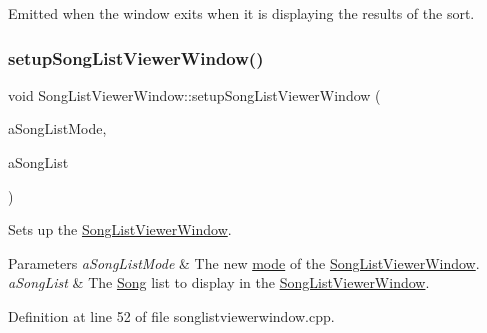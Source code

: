 Emitted when the window exits when it is displaying the results of the sort. 

\mbox{\label{class_song_list_viewer_window_ae26127c85ed57885461c5143be4ae1e9}} 
\subsubsection{\texorpdfstring{setup\+Song\+List\+Viewer\+Window()}{setupSongListViewerWindow()}}
{\footnotesize\ttfamily void Song\+List\+Viewer\+Window\+::setup\+Song\+List\+Viewer\+Window (\begin{DoxyParamCaption}\item[{\mbox{\hyperlink{class_song_list_viewer_window_a6f23a68c416173f6b571a2cc4990a927}{S\+O\+N\+G\+\_\+\+L\+I\+S\+T\+\_\+\+M\+O\+DE}}}]{a\+Song\+List\+Mode,  }\item[{Q\+List$<$ \mbox{\hyperlink{class_song}{Song}} $\ast$$>$ $\ast$}]{a\+Song\+List }\end{DoxyParamCaption})}



Sets up the \mbox{\hyperlink{class_song_list_viewer_window}{Song\+List\+Viewer\+Window}}. 


\begin{DoxyParams}{Parameters}
{\em a\+Song\+List\+Mode} & The new \mbox{\hyperlink{class_song_list_viewer_window_a6f23a68c416173f6b571a2cc4990a927}{mode}} of the \mbox{\hyperlink{class_song_list_viewer_window}{Song\+List\+Viewer\+Window}}. \\
\hline
{\em a\+Song\+List} & The \mbox{\hyperlink{class_song}{Song}} list to display in the \mbox{\hyperlink{class_song_list_viewer_window}{Song\+List\+Viewer\+Window}}. \\
\hline
\end{DoxyParams}


Definition at line 52 of file songlistviewerwindow.\+cpp.


